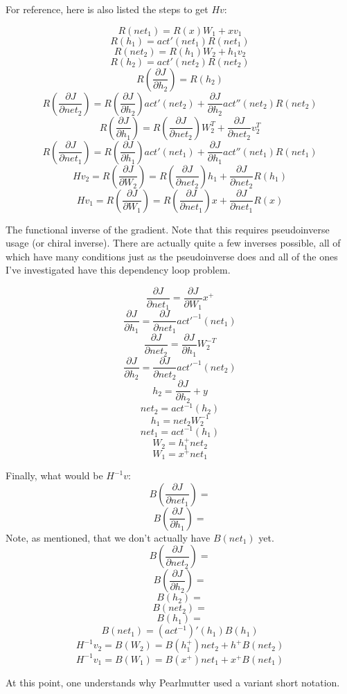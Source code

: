 \documentclass{article}
\begin{document}
For reference, here is also listed the steps to get $Hv$:

$$ R(net_1) = R(x)W_1 + xv_1 $$
$$ R(h_1) = act'(net_1)R(net_1) $$
$$ R(net_2) = R(h_1)W_2 + h_1v_2 $$
$$ R(h_2) = act'(net_2)R(net_2) $$
$$ R(\frac{\partial J}{\partial h_2}) = R(h_2) $$
$$ R(\frac{\partial J}{\partial net_2}) = R(\frac{\partial J}{\partial h_2}) act'(net_2) +
        \frac{\partial J}{\partial h_2} act''(net_2) R(net_2)$$
$$ R(\frac{\partial J}{\partial h_1}) = R(\frac{\partial J}{\partial net_2}) W_2^T + \frac{\partial J}{\partial net_2} v_2^T $$
$$ R(\frac{\partial J}{\partial net_1}) = R(\frac{\partial J}{\partial h_1}) act'(net_1) +
        \frac{\partial J}{\partial h_1} act''(net_1) R(net_1)$$
$$ Hv_2 = R(\frac{\partial J}{\partial W_2}) = R(\frac{\partial J}{\partial net_2}) h_1 + \frac{\partial J}{\partial net_2} R(h_1)$$
$$ Hv_1 = R(\frac{\partial J}{\partial W_1}) = R(\frac{\partial J}{\partial net_1}) x + \frac{\partial J}{\partial net_1} R(x)$$

The functional inverse of the gradient. Note that this requires pseudoinverse usage (or chiral inverse). There are actually quite a few inverses possible, all of which have many conditions just as the pseudoinverse does and all of the ones I've investigated have this dependency loop problem.

$$ \frac{\partial J}{\partial net_1} = \frac{\partial J}{\partial W_1} x^+$$
$$ \frac{\partial J}{\partial h_1} = \frac{\partial J}{\partial net_1} act'^{-1}(net_1)$$
$$ \frac{\partial J}{\partial net_2} = \frac{\partial J}{\partial h_1} W_2^{-T} $$
$$ \frac{\partial J}{\partial h_2} = \frac{\partial J}{\partial net_2} act'^{-1}(net_2)$$
$$ h_2 = \frac{\partial J}{\partial h_2} + y$$
$$ net_2 = act^{-1}(h_2)$$
$$ h_1 = net_2 W_2^{-1}$$
$$ net_1 = act^{-1}(h_1)$$
$$ W_2 = h_1^+ net_2$$
$$ W_1 = x^+ net_1$$

Finally, what would be $H^{-1}v$:
$$ B(\frac{\partial J}{\partial net_1}) = $$ %
$$ B(\frac{\partial J}{\partial h_1}) = $$ %
Note, as mentioned, that we don't actually have $B(net_1)$ yet.
$$ B(\frac{\partial J}{\partial net_2}) = $$ %
$$ B(\frac{\partial J}{\partial h_2}) = $$ %
$$ B(h_2) = $$ %
$$ B(net_2) = $$ %
$$ B(h_1) = $$ %
$$ B(net_1) = (act^{-1})'(h_1)B(h_1)$$
$$ H^{-1}v_2 = B(W_2) = B(h_1^+) net_2 + h^+ B(net_2)$$
$$ H^{-1}v_1 = B(W_1) = B(x^+) net_1 + x^+ B(net_1)$$

At this point, one understands why Pearlmutter used a variant short notation.
\end{document}
